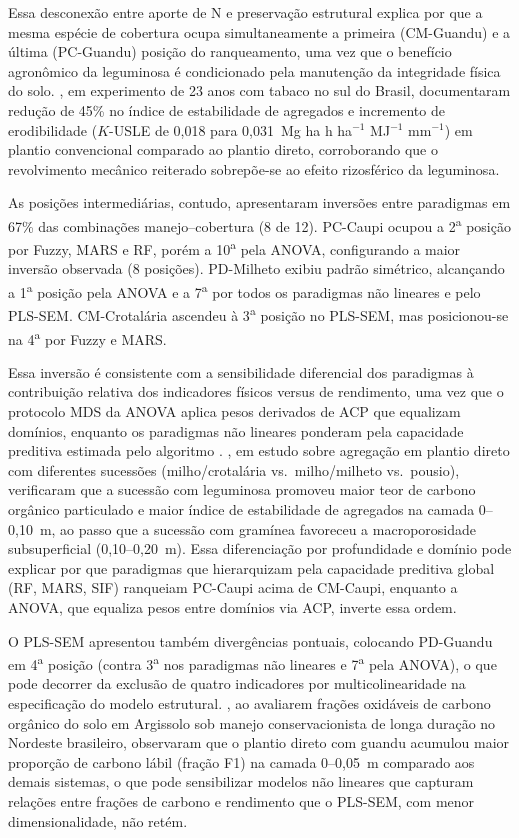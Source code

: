 \documentclass[pdflatex,sn-basic]{sn-jnl}%
\begin{document}
Essa desconexão entre aporte de N e preservação estrutural explica por que a mesma espécie de cobertura ocupa simultaneamente a primeira (CM-Guandu) e a última (PC-Guandu) posição do ranqueamento, uma vez que o benefício agronômico da leguminosa é condicionado pela manutenção da integridade física do solo. \cite{Thomaz2022}, em experimento de 23 anos com tabaco no sul do Brasil, documentaram redução de 45\% no índice de estabilidade de agregados e incremento de erodibilidade ($K$-USLE de 0,018 para 0,031~Mg ha h ha$^{-1}$ MJ$^{-1}$ mm$^{-1}$) em plantio convencional comparado ao plantio direto, corroborando que o revolvimento mecânico reiterado sobrepõe-se ao efeito rizosférico da leguminosa.

As posições intermediárias, contudo, apresentaram inversões entre paradigmas em 67\% das combinações manejo--cobertura (8 de 12). PC-Caupi ocupou a 2\textsuperscript{a} posição por Fuzzy, MARS e RF, porém a 10\textsuperscript{a} pela ANOVA, configurando a maior inversão observada (8 posições). PD-Milheto exibiu padrão simétrico, alcançando a 1\textsuperscript{a} posição pela ANOVA e a 7\textsuperscript{a} por todos os paradigmas não lineares e pelo PLS-SEM. CM-Crotalária ascendeu à 3\textsuperscript{a} posição no PLS-SEM, mas posicionou-se na 4\textsuperscript{a} por Fuzzy e MARS. 

Essa inversão é consistente com a sensibilidade diferencial dos paradigmas à contribuição relativa dos indicadores físicos versus de rendimento, uma vez que o protocolo MDS da ANOVA aplica pesos derivados de ACP que equalizam domínios, enquanto os paradigmas não lineares ponderam pela capacidade preditiva estimada pelo algoritmo \citep{Zeraatpisheh2020}. \cite{Fernandes2022}, em estudo sobre agregação em plantio direto com diferentes sucessões (milho/crotalária vs.\ milho/milheto vs.\ pousio), verificaram que a sucessão com leguminosa promoveu maior teor de carbono orgânico particulado e maior índice de estabilidade de agregados na camada 0--0,10~m, ao passo que a sucessão com gramínea favoreceu a macroporosidade subsuperficial (0,10--0,20~m). Essa diferenciação por profundidade e domínio pode explicar por que paradigmas que hierarquizam pela capacidade preditiva global (RF, MARS, SIF) ranqueiam PC-Caupi acima de CM-Caupi, enquanto a ANOVA, que equaliza pesos entre domínios via ACP, inverte essa ordem.

O PLS-SEM apresentou também divergências pontuais, colocando PD-Guandu em 4\textsuperscript{a} posição (contra 3\textsuperscript{a} nos paradigmas não lineares e 7\textsuperscript{a} pela ANOVA), o que pode decorrer da exclusão de quatro indicadores por multicolinearidade na especificação do modelo estrutural. \cite{OliveiraFCC2024}, ao avaliarem frações oxidáveis de carbono orgânico do solo em Argissolo sob manejo conservacionista de longa duração no Nordeste brasileiro, observaram que o plantio direto com guandu acumulou maior proporção de carbono lábil (fração F1) na camada 0--0,05~m comparado aos demais sistemas, o que pode sensibilizar modelos não lineares que capturam relações entre frações de carbono e rendimento que o PLS-SEM, com menor dimensionalidade, não retém.
\end{document}
